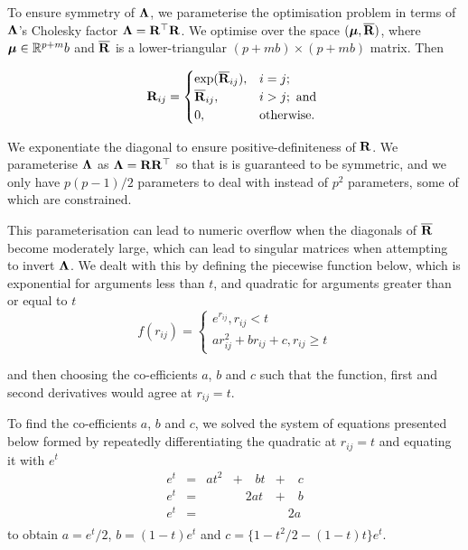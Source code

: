 To ensure symmetry of ${\boldsymbol \Lambda}$, we parameterise the optimisation problem in
terms of ${\boldsymbol \Lambda}$'s Cholesky factor  ${\boldsymbol \Lambda} = {\bf R}^\top {\bf R}$. We optimise
over the space $({\boldsymbol \mu}, \overline{{\bf R}})$, where ${\boldsymbol \mu} \in {\mathbb{R}}^{p + m}b$ and
$\overline{{\bf R}}$ is a lower-triangular $(p + mb) \times (p + mb)$ matrix. Then
		
\begin{equation*}
	{\bf R}_{ij} =
	\begin{cases}
		\exp(\overline{{\bf R}}_{ij}), & i = j;\\
		\overline{{\bf R}}_{ij},       & i > j; \text{ and }\\
		0,                         & \text{otherwise}. 
	\end{cases}
\end{equation*}
		
\noindent We exponentiate the diagonal to ensure positive-definiteness of
${\bf R}$. We parameterise ${\boldsymbol \Lambda}$ as ${\boldsymbol \Lambda} = {\bf R} {\bf R}^\top$ so that is is
guaranteed to be symmetric, and we only have $p(p-1)/2$ parameters to deal with
instead of $p^2$ parameters, some of which are constrained. 

This parameterisation can lead to numeric overflow when the diagonals of
$\overline{{\bf R}}$ become moderately large, which can lead to singular matrices
when attempting to invert ${\boldsymbol \Lambda}$. We dealt with this by defining the
piecewise function below, which is exponential for arguments less than $t$, and
quadratic for arguments greater than or equal to $t$
\begin{equation}
\label{eq:piecewise_function}
f(r_{ij}) =
\begin{cases}
	e^{r_{ij}}, r_{ij} < t                   \\
	a r_{ij}^2 + b r_{ij} + c, r_{ij} \geq t 
\end{cases}
\end{equation}

\noindent and then choosing the co-efficients $a$, $b$ and $c$ such that the
function, first and second derivatives would agree at $r_{ij} = t$.

To find the co-efficients $a$, $b$ and $c$, we solved the system of equations
presented below formed by repeatedly  differentiating the quadratic at $r_{ij}
=  t$ and equating it with $e^t$
\begin{equation}
\label{eq:system_of_equations}
\begin{array}{lllll}
	e^t & = & a t^2 & + \quad b t & + \quad c \\
	e^t & = &       & \quad 2a t  & + \quad b \\
	e^t & = &       &             & \quad 2a  \\
\end{array}
\end{equation}
\noindent to obtain $a = e^t / 2$, $b = (1 - t) e^t$ and $c = \{1 - t^2/2 - (1 - t) t\} e^t$.

